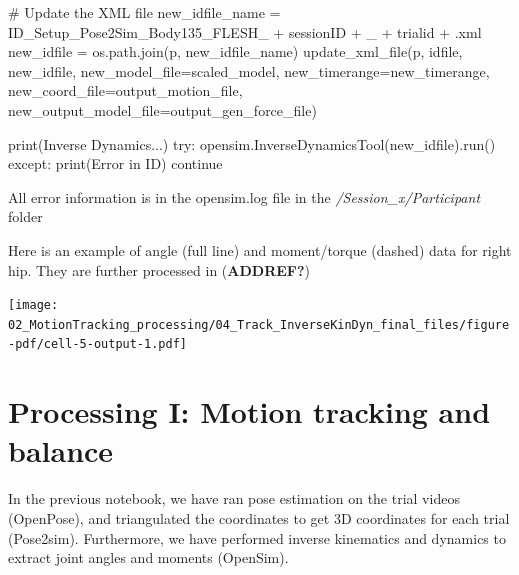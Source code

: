 \documentclass[
  letterpaper,
  DIV=11,
  numbers=noendperiod]{scrreprt}
\newenvironment{Shaded}{\begin{snugshade}}{\end{snugshade}}
\newcommand{\BuiltInTok}[1]{\textcolor[rgb]{0.00,0.23,0.31}{#1}}
\newcommand{\CommentTok}[1]{\textcolor[rgb]{0.37,0.37,0.37}{#1}}
\newcommand{\ControlFlowTok}[1]{\textcolor[rgb]{0.00,0.23,0.31}{#1}}
\newcommand{\NormalTok}[1]{\textcolor[rgb]{0.00,0.23,0.31}{#1}}
\newcommand{\OperatorTok}[1]{\textcolor[rgb]{0.37,0.37,0.37}{#1}}
\newcommand{\StringTok}[1]{\textcolor[rgb]{0.13,0.47,0.30}{#1}}
\begin{document}
\begin{Shaded}
\begin{Highlighting}[]
            \CommentTok{\# Update the XML file}
\NormalTok{            new\_idfile\_name }\OperatorTok{=} \StringTok{\textquotesingle{}ID\_Setup\_Pose2Sim\_Body135\_FLESH\_\textquotesingle{}} \OperatorTok{+}\NormalTok{ sessionID }\OperatorTok{+} \StringTok{\textquotesingle{}\_\textquotesingle{}} \OperatorTok{+}\NormalTok{ trialid }\OperatorTok{+} \StringTok{\textquotesingle{}.xml\textquotesingle{}}
\NormalTok{            new\_idfile }\OperatorTok{=}\NormalTok{ os.path.join(p, new\_idfile\_name)}
\NormalTok{            update\_xml\_file(p, idfile, new\_idfile, new\_model\_file}\OperatorTok{=}\NormalTok{scaled\_model, new\_timerange}\OperatorTok{=}\NormalTok{new\_timerange, new\_coord\_file}\OperatorTok{=}\NormalTok{output\_motion\_file, new\_output\_model\_file}\OperatorTok{=}\NormalTok{output\_gen\_force\_file)}

            \BuiltInTok{print}\NormalTok{(}\StringTok{\textquotesingle{}Inverse Dynamics...\textquotesingle{}}\NormalTok{)}
            \ControlFlowTok{try}\NormalTok{:}
\NormalTok{                opensim.InverseDynamicsTool(new\_idfile).run()}
            \ControlFlowTok{except}\NormalTok{:}
                \BuiltInTok{print}\NormalTok{(}\StringTok{\textquotesingle{}Error in ID\textquotesingle{}}\NormalTok{)}
                \ControlFlowTok{continue}
\end{Highlighting}
\end{Shaded}

All error information is in the opensim.log file in the
\emph{/Session\_x/Participant} folder

Here is an example of angle (full line) and moment/torque (dashed) data
for right hip. They are further processed in (\textbf{ADDREF?})

\texttt{[image: 02\_MotionTracking\_processing/04\_Track\_InverseKinDyn\_final\_files/figure-pdf/cell-5-output-1.pdf]}


\chapter{Processing I: Motion tracking and
balance}\label{processing-i-motion-tracking-and-balance}

In the previous notebook, we have ran pose estimation on the trial
videos (OpenPose), and triangulated the coordinates to get 3D
coordinates for each trial (Pose2sim). Furthermore, we have performed
inverse kinematics and dynamics to extract joint angles and moments
(OpenSim).
\end{document}
